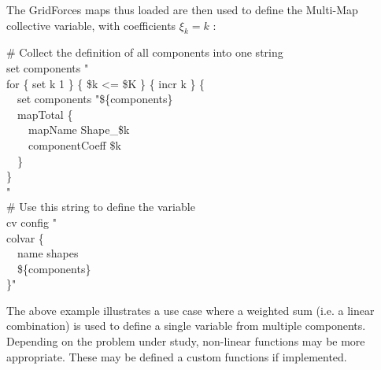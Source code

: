 {The GridForces maps thus loaded are then used to define the Multi-Map collective variable, with coefficients $\xi_k = k$ \cite{Fiorin2020}:\\
\begin{mdexampleinput}
  \-\# Collect the definition of all components into one string\\
  \-set components "\\
  \-for \{ set k 1 \} \{ \$k <= \$K \} \{ incr k \} \{\\
  \-~~set components "\$\{components\}\\
  \-~~mapTotal \{\\
  \-~~~~mapName Shape\_\$k\\
  \-~~~~componentCoeff \$k\\
  \-~~\}\\
  \-\}\\
  \-"\\
  \-\# Use this string to define the variable\\
  \-cv config "\\
  \-colvar \{\\
  \-\-~~name shapes\\
  \-\-~~\$\{components\}\\
  \-\}"
\end{mdexampleinput}

The above example illustrates a use case where a weighted sum (i.e.{} a linear combination) is used to define a single variable from multiple components.
Depending on the problem under study, non-linear functions may be more appropriate.
These may be defined a custom functions if implemented.

}\fi %




